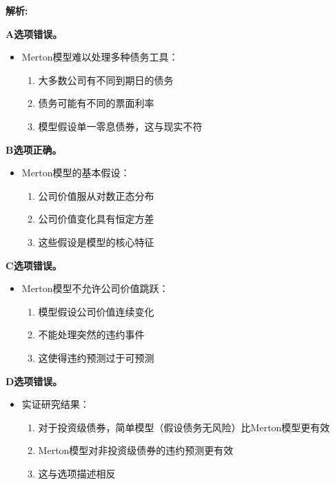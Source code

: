\documentclass{article}
\newenvironment{explanation}
{\textbf{解析:}\par}
{\par}
\begin{document}
\begin{explanation}
    \textbf{A选项错误。}
    \begin{itemize}
        \item Merton模型难以处理多种债务工具：
        \begin{enumerate}
            \item 大多数公司有不同到期日的债务
            \item 债务可能有不同的票面利率
            \item 模型假设单一零息债券，这与现实不符
        \end{enumerate}
    \end{itemize}
    
    \textbf{B选项正确。}
    \begin{itemize}
        \item Merton模型的基本假设：
        \begin{enumerate}
            \item 公司价值服从对数正态分布
            \item 公司价值变化具有恒定方差
            \item 这些假设是模型的核心特征
        \end{enumerate}
    \end{itemize}
    
    \textbf{C选项错误。}
    \begin{itemize}
        \item Merton模型不允许公司价值跳跃：
        \begin{enumerate}
            \item 模型假设公司价值连续变化
            \item 不能处理突然的违约事件
            \item 这使得违约预测过于可预测
        \end{enumerate}
    \end{itemize}
    
    \textbf{D选项错误。}
    \begin{itemize}
        \item 实证研究结果：
        \begin{enumerate}
            \item 对于投资级债券，简单模型（假设债务无风险）比Merton模型更有效
            \item Merton模型对非投资级债券的违约预测更有效
            \item 这与选项描述相反
        \end{enumerate}
    \end{itemize}
\end{explanation}
\end{document}
